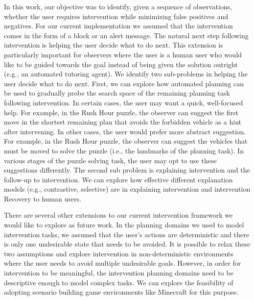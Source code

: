In this work, our objective was to identify, given a sequence of observations, whether the user requires intervention while minimizing false positives and negatives. 
For our current implementation we assumed that the intervention comes in the form of a block or an alert message. 
The natural next step following intervention is helping the user decide what to do next. 
This extension is particularly important for observers where the user is a human user who would like to be guided towards the goal instead of being given the solution outright (e.g., an automated tutoring agent). 
We identify two sub-problems in helping the user decide what to do next. 
First, we can explore how automated planning can be used to gradually probe the search space of the remaining planning task following intervention. 
In certain cases, the user may want a quick, well-focused help. 
For example, in the Rush Hour puzzle, the observer can suggest the first move in the shortest remaining plan that avoids the forbidden vehicle as a hint after intervening. 
In other cases, the user would prefer more abstract suggestion. 
For example, in the Rush Hour puzzle, the observer can suggest the vehicles that must be moved to solve the puzzle (i.e., the landmarks of the planning task). 
In various stages of the puzzle solving task, the user may opt to use these suggestions differently. 
The second sub problem is explaining intervention and the follow-up to intervention. 
We can explore how effective different explanation models (e.g., contrastive, selective) are in explaining intervention and intervention Recovery to human users.

There are several other extensions to our current intervention framework we would like to explore as future work. 
In the planning domains we used to model intervention tasks, we assumed that the user's actions are deterministic and there is only one undesirable state that needs to be avoided. 
It is possible to relax these two assumptions and explore intervention in non-deterministic environments where the user needs to avoid multiple undesirable goals. 
However, in order for intervention to be meaningful, the intervention planning domains need to be descriptive enough to model complex tasks. 
We can explore the feasibility of adopting scenario building game environments like Minecraft for this purpose.
